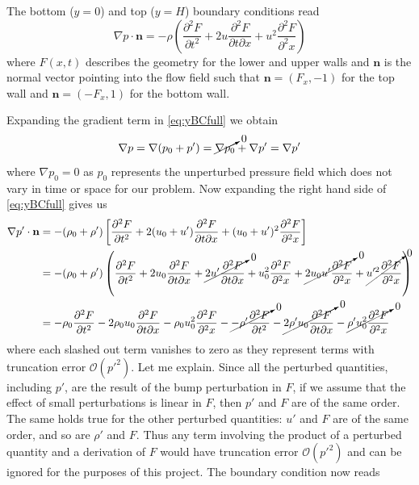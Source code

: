 \documentclass[11pt]{article}
\begin{document}
The bottom ($y=0$) and top ($y=H$) boundary conditions read
\begin{equation} \label{eq:yBCfull}
\nabla p \cdot \mathbf{n} = -\rho \left( \frac{\partial^2 F}{\partial t^2} + 2u\frac{\partial^2 F}{\partial t \partial x} + u^2 \frac{\partial^2 F}{\partial^2 x} \right)
\end{equation}
where $F(x,t)$ describes the geometry for the lower and upper walls and $\mathbf{n}$ is the normal vector pointing into the flow field such that $\mathbf{n} = (F_x, -1)$ for the top wall and $\mathbf{n} = (-F_x, 1)$ for the bottom wall.

Expanding the gradient term in \eqref{eq:yBCfull} we obtain 
\begin{equation*}
  \nabla p = \nabla(p_0 + p') = \cancelto{0}{\nabla p_0} + \nabla p' = \nabla p'
\end{equation*}
where $\nabla p_0 = 0$ as $p_0$ represents the unperturbed pressure field which does not vary in time or space for our problem. Now expanding the right hand side of \eqref{eq:yBCfull} gives us
\begin{align*}
  \nabla p' \cdot \mathbf{n}
  &= -(\rho_0 + \rho') \left[ \frac{\partial^2 F}{\partial t^2} + 2(u_0 + u')\frac{\partial^2 F}{\partial t \partial x} + (u_0 + u')^2 \frac{\partial^2 F}{\partial^2 x} \right] \\
  &= -(\rho_0 + \rho') \left( \frac{\partial^2 F}{\partial t^2} + 2u_0 \frac{\partial^2 F}{\partial t \partial x} + \cancelto{0}{2u'\frac{\partial^2 F}{\partial t \partial x}} + u_0^2\frac{\partial^2 F}{\partial^2 x} + \cancelto{0}{2u_0u' \frac{\partial^2 F}{\partial^2 x}} + \cancelto{0}{u'^2 \frac{\partial^2 F}{\partial^2 x}} \right) \\
  &= -\rho_0 \frac{\partial^2 F}{\partial t^2} - 2\rho_0 u_0 \frac{\partial^2 F}{\partial t \partial x} - \rho_0 u_0^2\frac{\partial^2 F}{\partial^2 x} - \cancelto{0}{-\rho' \frac{\partial^2 F}{\partial t^2}} - \cancelto{0}{2\rho' u_0 \frac{\partial^2 F}{\partial t \partial x}} - \cancelto{0}{\rho' u_0^2\frac{\partial^2 F}{\partial^2 x}}
\end{align*}
where each slashed out term vanishes to zero as they represent terms with truncation error $\mathcal{O}(p'^2)$. Let me explain. Since all the perturbed quantities, including $p'$, are the result of the bump perturbation in $F$, if we assume that the effect of small perturbations is linear in $F$, then $p'$ and $F$ are of the same order. The same holds true for the other perturbed quantities: $u'$ and $F$ are of the same order, and so are $\rho'$ and $F$. Thus any term involving the product of a perturbed quantity and a derivation of $F$ would have truncation error $\mathcal{O}(p'^2)$ and can be ignored for the purposes of this project. The boundary condition now reads
\end{document}
